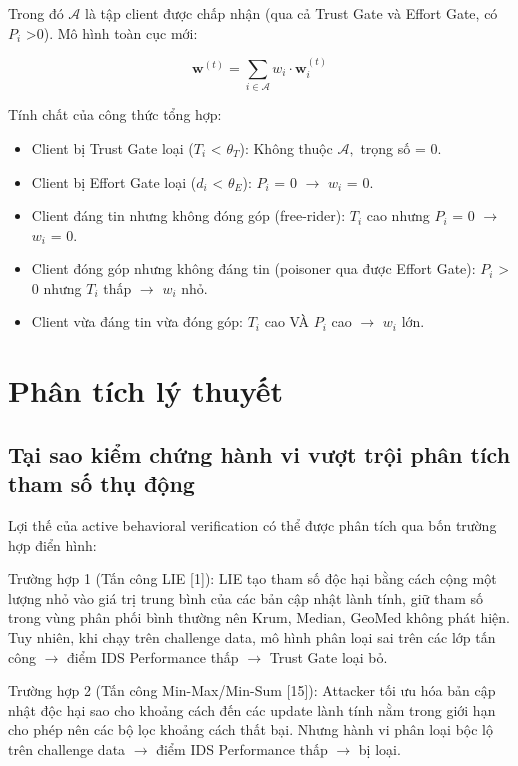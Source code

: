 Trong đó $\mathcal{A}$ là tập client được chấp nhận (qua cả Trust Gate và Effort Gate, có $P_{i}$ \textgreater 0). Mô hình toàn cục mới:

\begin{equation}
\mathbf{w}^{(t)} = \sum_{i \in \mathcal{A}}^{}w_{i} \cdot \mathbf{w}_{i}^{(t)}
\tag{4.12}
\end{equation}

Tính chất của công thức tổng hợp:

\begin{itemize}
\item
  Client bị Trust Gate loại ($T_{i}$ \textless{} $\theta_{T}$): Không thuộc $\mathcal{A},$ trọng số = 0.
\item
  Client bị Effort Gate loại ($d_{i}$ \textless{} $\theta_{E}$): $P_{i}$ = 0 $\rightarrow$ $w_{i}$ = 0.
\item
  Client đáng tin nhưng không đóng góp (free-rider): $T_{i}$ cao nhưng $P_{i}$ = 0 $\rightarrow$ $w_{i}$ = 0.
\item
  Client đóng góp nhưng không đáng tin (poisoner qua được Effort Gate): $P_{i}$ \textgreater{} 0 nhưng $T_{i}$ thấp $\rightarrow$ $w_{i}$ nhỏ.
\item
  Client vừa đáng tin vừa đóng góp: $T_{i}$ cao VÀ $P_{i}$ cao $\rightarrow$ $w_{i}$ lớn.
\end{itemize}

\section{Phân tích lý thuyết}

\subsection{Tại sao kiểm chứng hành vi vượt trội phân tích tham số thụ động}
Lợi thế của active behavioral verification có thể được phân tích qua bốn trường hợp điển hình:

Trường hợp 1 (Tấn công LIE {[}1{]}): LIE tạo tham số độc hại bằng cách cộng một lượng nhỏ vào giá trị trung bình của các bản cập nhật lành tính, giữ tham số trong vùng phân phối bình thường nên Krum, Median, GeoMed không phát hiện. Tuy nhiên, khi chạy trên challenge data, mô hình phân loại sai trên các lớp tấn công $\rightarrow$ điểm IDS Performance thấp $\rightarrow$ Trust Gate loại bỏ.

Trường hợp 2 (Tấn công Min-Max/Min-Sum {[}15{]}): Attacker tối ưu hóa bản cập nhật độc hại sao cho khoảng cách đến các update lành tính nằm trong giới hạn cho phép nên các bộ lọc khoảng cách thất bại. Nhưng hành vi phân loại bộc lộ trên challenge data $\rightarrow$ điểm IDS Performance thấp $\rightarrow$ bị loại.


